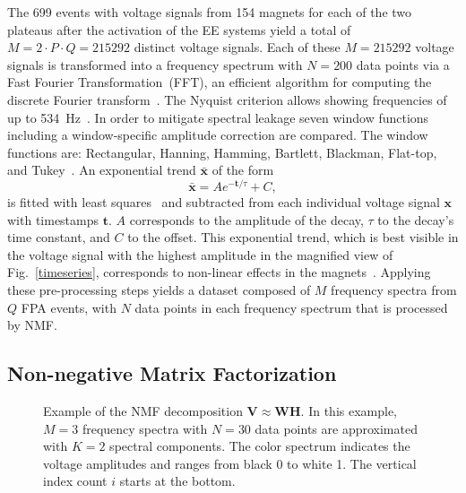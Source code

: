 \documentclass[lettersize,journal]{IEEEtran}
\begin{document}
The 699 events with voltage signals from 154 magnets for each of the two plateaus after the activation of the EE systems yield a total of $M=2\cdot P \cdot Q=215292$ distinct voltage signals.
Each of these $M=215292$ voltage signals is transformed into a frequency spectrum with $N=200$ data points via a Fast Fourier Transformation~(FFT), an efficient algorithm for computing the discrete Fourier transform~\cite{nussbaumer1981fast}. The Nyquist criterion allows showing frequencies of up to 534~Hz~\cite{Oppenheim1999}.
In order to mitigate spectral leakage seven window functions including a window-specific amplitude correction are compared. The window functions are: Rectangular, Hanning, Hamming, Bartlett, Blackman, Flat-top, and Tukey~\cite{Harris1978}.
An exponential trend $\bar{\mathbf{x}}$ of the form 
\begin{equation}\label{exp_trend}
    \bar{\mathbf{x}} = Ae^{-\mathbf{t}/\tau}+C,
\end{equation}
is fitted with least squares~\cite{Bjorck1996} and subtracted from each individual voltage signal $\mathbf{x}$ with timestamps $\mathbf{t}$. 
$A$ corresponds to the amplitude of the decay, $\tau$ to the decay's time constant, and $C$ to the offset. This exponential trend, which is best visible in the voltage signal with the highest amplitude in the magnified view of Fig.~\ref{timeseries}, corresponds to non-linear effects in the magnets~\cite{ravaioli2012}.
Applying these pre-processing steps yields a dataset composed of $M$ frequency spectra from $Q$ FPA events, with $N$ data points in each frequency spectrum that is processed by NMF.

\subsection{Non-negative Matrix Factorization}
\begin{figure}[]
\def\scalesize{0.75}
\centering 
    \subfloat[$\mathbf{V}$]{%
    \hspace{-1pt*1}\label{V_toy}}
\centering 
\centering 
    \subfloat[$\mathbf{W}$]{%
    \hspace{-1pt*1}\label{W_toy}}
\centering 
\centering 
    \subfloat[$\mathbf{H}$]{%
    \hspace{-1pt*1}\label{H_toy}}
\centering 
\caption{Example of the NMF decomposition $\mathbf{V} \approx \mathbf{W}\mathbf{H}$. In this example, $M=3$ frequency spectra with $N=30$ data points are approximated with $K=2$ spectral components. The color spectrum indicates the voltage amplitudes and ranges from black 0 to white 1. The vertical index count $i$ starts at the bottom.}
\label{toy}
\end{figure}
\end{document}
